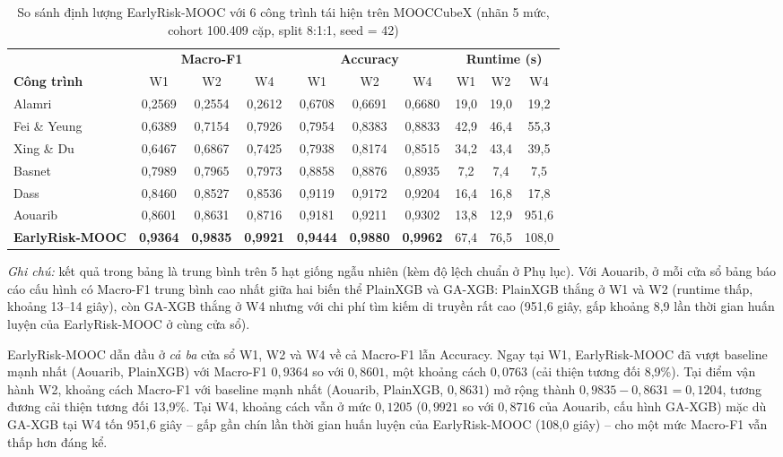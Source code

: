 \begin{table}[H]
\centering
\caption{So sánh định lượng EarlyRisk-MOOC với 6 công trình tái hiện trên MOOCCubeX (nhãn 5 mức, cohort 100.409 cặp, split 8:1:1, seed = 42)}
\label{tab:sosanh}
\renewcommand{\arraystretch}{1.25}
\footnotesize
\begin{tabular}{@{}l ccc ccc ccc@{}}
\toprule
& \multicolumn{3}{c}{\textbf{Macro-F1}} & \multicolumn{3}{c}{\textbf{Accuracy}} & \multicolumn{3}{c}{\textbf{Runtime (s)}} \\
\cmidrule(lr){2-4}\cmidrule(lr){5-7}\cmidrule(lr){8-10}
\textbf{Công trình} & W1 & W2 & W4 & W1 & W2 & W4 & W1 & W2 & W4 \\
\midrule
Alamri \cite{Alamri2019}      & 0,2569 & 0,2554 & 0,2612 & 0,6708 & 0,6691 & 0,6680 & 19,0 & 19,0 & 19,2 \\
Fei \& Yeung \cite{Fei2015}   & 0,6389 & 0,7154 & 0,7926 & 0,7954 & 0,8383 & 0,8833 & 42,9 & 46,4 & 55,3 \\
Xing \& Du \cite{Xing2019}    & 0,6467 & 0,6867 & 0,7425 & 0,7938 & 0,8174 & 0,8515 & 34,2 & 43,4 & 39,5 \\
Basnet \cite{Basnet2022}      & 0,7989 & 0,7965 & 0,7973 & 0,8858 & 0,8876 & 0,8935 & 7,2 & 7,4 & 7,5 \\
Dass \cite{Dass2021}          & 0,8460 & 0,8527 & 0,8536 & 0,9119 & 0,9172 & 0,9204 & 16,4 & 16,8 & 17,8 \\
Aouarib \cite{Aouarib2025}    & 0,8601 & 0,8631 & 0,8716 & 0,9181 & 0,9211 & 0,9302 & 13,8 & 12,9 & 951,6 \\
\textbf{EarlyRisk-MOOC}       & \textbf{0,9364} & \textbf{0,9835} & \textbf{0,9921} & \textbf{0,9444} & \textbf{0,9880} & \textbf{0,9962} & 67,4 & 76,5 & 108,0 \\
\bottomrule
\end{tabular}
\end{table}

\emph{Ghi chú:} kết quả trong bảng là trung bình trên 5 hạt giống ngẫu nhiên (kèm độ lệch chuẩn ở Phụ lục). Với Aouarib, ở mỗi cửa sổ bảng báo cáo cấu hình có Macro-F1 trung bình cao nhất giữa hai biến thể PlainXGB và GA-XGB: PlainXGB thắng ở W1 và W2 (runtime thấp, khoảng 13--14 giây), còn GA-XGB thắng ở W4 nhưng với chi phí tìm kiếm di truyền rất cao (951,6 giây, gấp khoảng 8,9 lần thời gian huấn luyện của EarlyRisk-MOOC ở cùng cửa sổ).

EarlyRisk-MOOC dẫn đầu ở \emph{cả ba} cửa sổ W1, W2 và W4 về cả Macro-F1 lẫn Accuracy. Ngay tại W1, EarlyRisk-MOOC đã vượt baseline mạnh nhất (Aouarib, PlainXGB) với Macro-F1 $0{,}9364$ so với $0{,}8601$, một khoảng cách $0{,}0763$ (cải thiện tương đối 8,9\%). Tại điểm vận hành W2, khoảng cách Macro-F1 với baseline mạnh nhất (Aouarib, PlainXGB, $0{,}8631$) mở rộng thành $0{,}9835 - 0{,}8631 = 0{,}1204$, tương đương cải thiện tương đối 13,9\%. Tại W4, khoảng cách vẫn ở mức $0{,}1205$ ($0{,}9921$ so với $0{,}8716$ của Aouarib, cấu hình GA-XGB) mặc dù GA-XGB tại W4 tốn 951,6 giây -- gấp gần chín lần thời gian huấn luyện của EarlyRisk-MOOC (108,0 giây) -- cho một mức Macro-F1 vẫn thấp hơn đáng kể.

